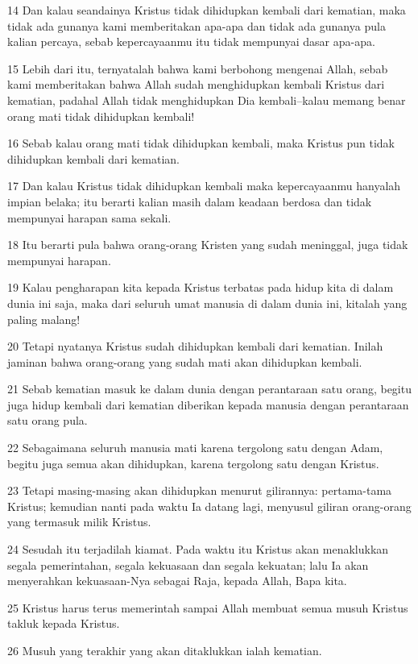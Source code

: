 \par 14 Dan kalau seandainya Kristus tidak dihidupkan kembali dari kematian, maka tidak ada gunanya kami memberitakan apa-apa dan tidak ada gunanya pula kalian percaya, sebab kepercayaanmu itu tidak mempunyai dasar apa-apa.
\par 15 Lebih dari itu, ternyatalah bahwa kami berbohong mengenai Allah, sebab kami memberitakan bahwa Allah sudah menghidupkan kembali Kristus dari kematian, padahal Allah tidak menghidupkan Dia kembali--kalau memang benar orang mati tidak dihidupkan kembali!
\par 16 Sebab kalau orang mati tidak dihidupkan kembali, maka Kristus pun tidak dihidupkan kembali dari kematian.
\par 17 Dan kalau Kristus tidak dihidupkan kembali maka kepercayaanmu hanyalah impian belaka; itu berarti kalian masih dalam keadaan berdosa dan tidak mempunyai harapan sama sekali.
\par 18 Itu berarti pula bahwa orang-orang Kristen yang sudah meninggal, juga tidak mempunyai harapan.
\par 19 Kalau pengharapan kita kepada Kristus terbatas pada hidup kita di dalam dunia ini saja, maka dari seluruh umat manusia di dalam dunia ini, kitalah yang paling malang!
\par 20 Tetapi nyatanya Kristus sudah dihidupkan kembali dari kematian. Inilah jaminan bahwa orang-orang yang sudah mati akan dihidupkan kembali.
\par 21 Sebab kematian masuk ke dalam dunia dengan perantaraan satu orang, begitu juga hidup kembali dari kematian diberikan kepada manusia dengan perantaraan satu orang pula.
\par 22 Sebagaimana seluruh manusia mati karena tergolong satu dengan Adam, begitu juga semua akan dihidupkan, karena tergolong satu dengan Kristus.
\par 23 Tetapi masing-masing akan dihidupkan menurut gilirannya: pertama-tama Kristus; kemudian nanti pada waktu Ia datang lagi, menyusul giliran orang-orang yang termasuk milik Kristus.
\par 24 Sesudah itu terjadilah kiamat. Pada waktu itu Kristus akan menaklukkan segala pemerintahan, segala kekuasaan dan segala kekuatan; lalu Ia akan menyerahkan kekuasaan-Nya sebagai Raja, kepada Allah, Bapa kita.
\par 25 Kristus harus terus memerintah sampai Allah membuat semua musuh Kristus takluk kepada Kristus.
\par 26 Musuh yang terakhir yang akan ditaklukkan ialah kematian.
